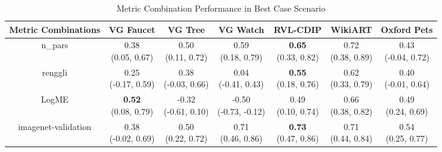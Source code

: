 \begin{table}[H]
\centering
\caption{Metric Combination Performance in Best Case Scenario}
\label{tab:main-combo-results}
\setlength\tabcolsep{1.5pt}
\begin{tabular}{c|cccccc}
\textbf{Metric Combinations} & \textbf{VG Faucet} & \textbf{VG Tree} & \textbf{VG Watch} & \textbf{RVL-CDIP} & \textbf{WikiART} & \textbf{Oxford Pets} \\
\hline
n_pars & \makecell{0.38 \\[0pt] (0.05, 0.67)} & \makecell{0.50 \\[0pt] (0.11, 0.72)} & \makecell{0.59 \\[0pt] (0.18, 0.79)} & \makecell{\textbf{0.65} \\[0pt] (0.33, 0.82)} & \makecell{0.72 \\[0pt] (0.38, 0.89)} & \makecell{0.43 \\[0pt] (-0.04, 0.72)} \\
\hline
renggli & \makecell{0.25 \\[0pt] (-0.17, 0.59)} & \makecell{0.38 \\[0pt] (-0.03, 0.66)} & \makecell{0.04 \\[0pt] (-0.41, 0.43)} & \makecell{\textbf{0.55} \\[0pt] (0.18, 0.76)} & \makecell{0.62 \\[0pt] (0.33, 0.79)} & \makecell{0.40 \\[0pt] (-0.01, 0.64)} \\
\hline
LogME & \makecell{\textbf{0.52} \\[0pt] (0.08, 0.79)} & \makecell{-0.32 \\[0pt] (-0.61, 0.10)} & \makecell{-0.50 \\[0pt] (-0.73, -0.12)} & \makecell{0.49 \\[0pt] (0.10, 0.74)} & \makecell{0.66 \\[0pt] (0.38, 0.82)} & \makecell{0.49 \\[0pt] (0.24, 0.69)} \\
\hline
imagenet-validation & \makecell{0.38 \\[0pt] (-0.02, 0.69)} & \makecell{0.50 \\[0pt] (0.22, 0.72)} & \makecell{0.71 \\[0pt] (0.46, 0.86)} & \makecell{\textbf{0.73} \\[0pt] (0.47, 0.86)} & \makecell{0.71 \\[0pt] (0.44, 0.84)} & \makecell{0.54 \\[0pt] (0.25, 0.77)} \\

\end{tabular}
\end{table}
